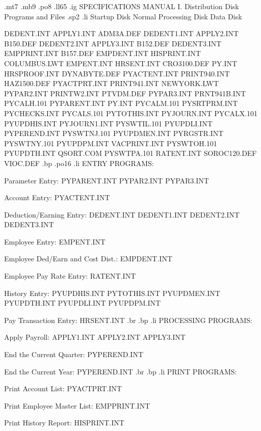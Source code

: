 .mt7
.mb9
.po8
.ll65
.ig
SPECIFICATIONS MANUAL
I. Distribution Disk Programs and Files
.sp2
.li
   Startup Disk        Normal Processing Disk	    Data Disk

    DEDENT.INT		    APPLY1.INT		    ADM3A.DEF
    DEDENT1.INT 	    APPLY2.INT		    B150.DEF
    DEDENT2.INT 	    APPLY3.INT		    B152.DEF
    DEDENT3.INT 	    EMPPRINT.INT	    B157.DEF
    EMPDENT.INT 	    HISPRINT.INT	    COLUMBUS.LWT
    EMPENT.INT		    HRSENT.INT		    CRO3100.DEF
    PY.INT		    HRSPROOF.INT	    DYNABYTE.DEF
    PYACTENT.INT	    PRINT940.INT	    HAZ1500.DEF
    PYACTPRT.INT	    PRINT941.INT	    NEWYORK.LWT
    PYPAR2.INT		    PRINTW2.INT 	    PTVDM.DEF
    PYPAR3.INT		    PRNT941B.INT	    PYCALH.101
    PYPARENT.INT	    PY.INT		    PYCALM.101
    PYSRTPRM.INT	    PYCHECKS.INT	    PYCALS.101
    PYTOTHIS.INT	    PYJOURN.INT 	    PYCALX.101
    PYUPDHIS.INT	    PYJOURN1.INT	    PYSWTIL.101
    PYUPDLI.INT 	    PYPEREND.INT	    PYSWTNJ.101
    PYUPDMEN.INT	    PYRGSTR.INT 	    PYSWTNY.101
    PYUPDPM.INT 	    VACPRINT.INT	    PYSWTOH.101
    PYUPDTH.INT 	    QSORT.COM		    PYSWTPA.101
    RATENT.INT					    SOROC120.DEF
						    VIOC.DEF
.bp
.po16
.li
ENTRY PROGRAMS:


Parameter Entry:		  PYPARENT.INT
				  PYPAR2.INT
				  PYPAR3.INT

Account Entry:			  PYACTENT.INT

Deduction/Earning Entry:	  DEDENT.INT
				  DEDENT1.INT
				  DEDENT2.INT
				  DEDENT3.INT

Employee Entry: 		  EMPENT.INT

Employee Ded/Earn and Cost Dist.: EMPDENT.INT

Employee Pay Rate Entry:	  RATENT.INT

History Entry:			  PYUPDHIS.INT
				  PYTOTHIS.INT
				  PYUPDMEN.INT
				  PYUPDTH.INT
				  PYUPDLI.INT
				  PYUPDPM.INT

Pay Transaction Entry:		  HRSENT.INT
.br
.bp
.li
PROCESSING PROGRAMS:


Apply Payroll:			  APPLY1.INT
				  APPLY2.INT
				  APPLY3.INT

End the Current Quarter:	  PYPEREND.INT

End the Current Year:		  PYPEREND.INT
.br
.bp
.li
PRINT PROGRAMS:


Print Account List:		  PYACTPRT.INT

Print Employee Master List:	  EMPPRINT.INT

Print History Report:		  HISPRINT.INT

